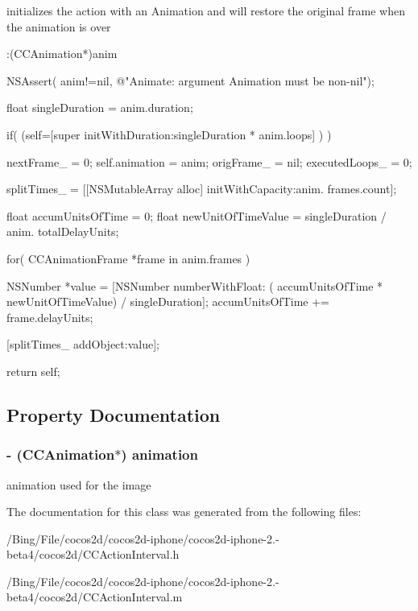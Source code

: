 initializes the action with an Animation and will restore the original frame when the animation is over 
\begin{DoxyCode}
                       :(CCAnimation*)anim
{
        NSAssert( anim!=nil, @"Animate: argument Animation must be non-nil");
        
        float singleDuration = anim.duration;

        if( (self=[super initWithDuration:singleDuration * anim.loops] ) ) {

                nextFrame_ = 0;
                self.animation = anim;
                origFrame_ = nil;
                executedLoops_ = 0;
                
                splitTimes_ = [[NSMutableArray alloc] initWithCapacity:anim.
      frames.count];
                
                float accumUnitsOfTime = 0;
                float newUnitOfTimeValue = singleDuration / anim.
      totalDelayUnits;
                
                for( CCAnimationFrame *frame in anim.frames ) {

                        NSNumber *value = [NSNumber numberWithFloat: (
      accumUnitsOfTime * newUnitOfTimeValue) / singleDuration];
                        accumUnitsOfTime += frame.delayUnits;

                        [splitTimes_ addObject:value];
                }               
        }
        return self;
}
\end{DoxyCode}


\subsection{Property Documentation}
\hypertarget{interface_c_c_animate_ae4a9ffbb8c0b5496a5c20c250ef4ac83}{
\subsubsection[{animation}]{\setlength{\rightskip}{0pt plus 5cm}-\/ ({\bf C\-C\-Animation}$\ast$) {\bf animation}}}\label{interface_c_c_animate_ae4a9ffbb8c0b5496a5c20c250ef4ac83}
animation used for the image 

The documentation for this class was generated from the following files\-:\begin{DoxyCompactItemize}
\item 
/\-Bing/\-File/cocos2d/cocos2d-\/iphone/cocos2d-\/iphone-\/2.-\/beta4/cocos2d/C\-C\-Action\-Interval.\-h\item 
/\-Bing/\-File/cocos2d/cocos2d-\/iphone/cocos2d-\/iphone-\/2.-\/beta4/cocos2d/C\-C\-Action\-Interval.\-m\end{DoxyCompactItemize}
